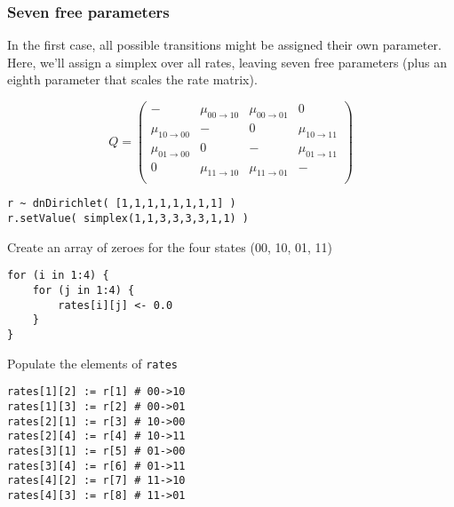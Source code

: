 \subsubsection{Seven free parameters}

In the first case, all possible transitions might be assigned their own parameter.
Here, we'll assign a simplex over all rates, leaving seven free parameters (plus an eighth parameter that scales the rate matrix).

\begin{equation*}
Q = \begin{pmatrix}
                      - & \mu_{00 \rightarrow 10} & \mu_{00 \rightarrow 01} &                       0 \\
\mu_{10 \rightarrow 00} &                       - &                       0 & \mu_{10 \rightarrow 11} \\
\mu_{01 \rightarrow 00} &                       0 &                       - & \mu_{01 \rightarrow 11} \\
                      0 & \mu_{11 \rightarrow 10} & \mu_{11 \rightarrow 01} &                       - \\
\end{pmatrix}
\end{equation*}

{\tt \begin{snugshade*}
\begin{lstlisting}
r ~ dnDirichlet( [1,1,1,1,1,1,1,1] )
r.setValue( simplex(1,1,3,3,3,3,1,1) )
\end{lstlisting}
\end{snugshade*}}

Create an array of zeroes for the four states (00, 10, 01, 11)

{\tt \begin{snugshade*}
\begin{lstlisting}
for (i in 1:4) {
    for (j in 1:4) {
        rates[i][j] <- 0.0
    }
}
\end{lstlisting}
\end{snugshade*}}

Populate the elements of {\tt rates}

{\tt \begin{snugshade*}
\begin{lstlisting}
rates[1][2] := r[1] # 00->10
rates[1][3] := r[2] # 00->01
rates[2][1] := r[3] # 10->00
rates[2][4] := r[4] # 10->11
rates[3][1] := r[5] # 01->00
rates[3][4] := r[6] # 01->11
rates[4][2] := r[7] # 11->10
rates[4][3] := r[8] # 11->01
\end{lstlisting}
\end{snugshade*}}

